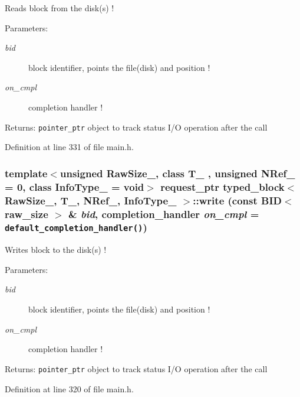 Reads block from the disk(s) ! 

\begin{Desc}
\item[Parameters:]
\begin{description}
\item[{\em bid}]block identifier, points the file(disk) and position ! \item[{\em on\_\-cmpl}]completion handler ! \end{description}
\end{Desc}
\begin{Desc}
\item[Returns:]{\tt pointer\_\-ptr} object to track status I/O operation after the call \end{Desc}


Definition at line 331 of file main.h.\hypertarget{group__mnglayer_gc9c8caa89ae04a3b8dc3d1793eda61b0}{
\subsubsection[{write}]{\setlength{\rightskip}{0pt plus 5cm}template$<$unsigned RawSize\_\-, class T\_\- , unsigned NRef\_\- = 0, class InfoType\_\-  = void$>$ {\bf request\_\-ptr} {\bf typed\_\-block}$<$ RawSize\_\-, T\_\-, NRef\_\-, InfoType\_\- $>$::write (const {\bf BID}$<$ raw\_\-size $>$ \& {\em bid}, \/  {\bf completion\_\-handler} {\em on\_\-cmpl} = {\tt {\bf default\_\-completion\_\-handler}()})}}
\label{group__mnglayer_gc9c8caa89ae04a3b8dc3d1793eda61b0}


Writes block to the disk(s) ! 

\begin{Desc}
\item[Parameters:]
\begin{description}
\item[{\em bid}]block identifier, points the file(disk) and position ! \item[{\em on\_\-cmpl}]completion handler ! \end{description}
\end{Desc}
\begin{Desc}
\item[Returns:]{\tt pointer\_\-ptr} object to track status I/O operation after the call \end{Desc}


Definition at line 320 of file main.h.